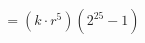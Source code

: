 \documentclass[preview]{standalone}
\begin{document}
\begin{align*}
= (k \cdot r^5) (2^{25} - 1)
\end{align*}
\end{document}
